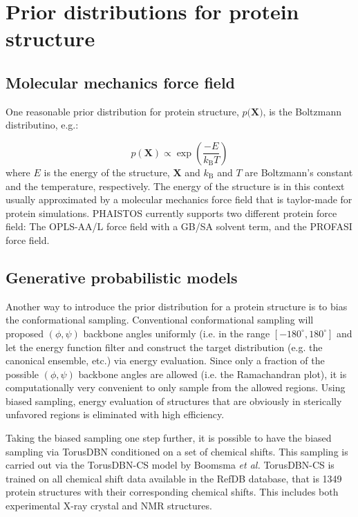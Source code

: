 \section{Prior distributions for protein structure}


\subsection{Molecular mechanics force field}

One reasonable prior distribution for protein structure, $p(\mathbf{X)}$, is the Boltzmann distributino, e.g.:

\begin{equation}
    p(\mathbf{X}) \propto \exp\left( \frac{-E}{k_\mathrm{B}T}\right)
\end{equation}
where $E$ is the energy of the structure, $\mathbf{X}$ and $k_\mathrm{B}$ and $T$ are Boltzmann's constant and the temperature, respectively.
The energy of the structure is in this context usually approximated by a molecular mechanics force field that is taylor-made for protein simulations. PHAISTOS currently supports two different protein force field: The OPLS-AA/L force field with a GB/SA solvent term, and the PROFASI force field.

\subsection{Generative probabilistic models}

Another way to introduce the prior distribution for a protein structure is to bias the conformational sampling. 
Conventional conformational sampling will proposed $(\phi, \psi)$ backbone angles uniformly (i.e. in the range $[-180^{\circ}, 180^{\circ}]$ and let the energy function filter and construct the target distribution (e.g. the canonical ensemble, etc.) via energy evaluation.
Since only a fraction of the possible $(\phi, \psi)$ backbone angles are allowed (i.e. the Ramachandran plot), it is computationally very convenient to only sample from the allowed regions.
Using biased sampling, energy evaluation of structures that are obviously in sterically unfavored regions is eliminated with high efficiency.

Taking the biased sampling one step further, it is possible to have the biased sampling via TorusDBN conditioned on a set of chemical shifts.
This sampling is carried out via the TorusDBN-CS model by Boomsma \textit{et al.} TorusDBN-CS is trained on all chemical shift data available in the RefDB database, that is 1349 protein structures with their corresponding chemical shifts. This includes both experimental X-ray crystal and NMR structures.

